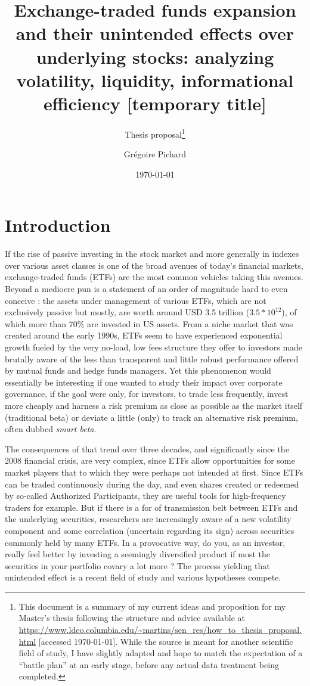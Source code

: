 \documentclass[a4paper, twoside, listof=totoc, toc=sectionentrywithdots]{scrartcl}
\title{Exchange-traded funds expansion and their unintended effects over underlying stocks: analyzing volatility, liquidity, informational efficiency {\small [temporary title]}}
\subtitle{Thesis proposal\footnote{This document is a summary of my current ideas and proposition for my Master's thesis following the structure and advice available at \url{https://www.ldeo.columbia.edu/~martins/sen_res/how_to_thesis_proposal.html} [accessed \today]. While the source is meant for another scientific field of study, I have slightly adapted and hope to match the expectation of a ``battle plan'' at an early stage, before any actual data treatment being completed.}}
\date{\today}
\author{Grégoire Pichard}
\begin{document}
\maketitle
\tableofcontents
\section{Introduction}
If the rise of passive investing in the stock market and more generally in indexes over various asset classes is one of the broad avenues of today's financial markets, exchange-traded funds (ETFs) are the most common vehicles taking this avenues. Beyond a mediocre pun is a statement of an order of magnitude hard to even conceive : the assets under management of various ETFs, which are not exclusively passive but mostly, are worth around USD 3.5 trillion ($3.5 * 10^{12}$), of which more than 70\% are invested in US assets. From a niche market that was created around the early 1990s, ETFs seem to have experienced exponential growth fueled by the very no-load, low fees structure they offer to investors made brutally aware of the less than transparent and little robust performance offered by mutual funds and hedge funds managers. Yet this phenomenon would essentially be interesting if one wanted to study their impact over corporate governance, if the goal were only, for investors, to trade less frequently, invest more cheaply and harness a risk premium as close as possible as the market itself (traditional beta) or deviate a little (only) to track an alternative risk premium, often dubbed \textit{smart beta}.

The consequences of that trend over three decades, and significantly since the 2008 financial crisis, are very complex, since ETFs allow opportunities for some market players that to which they were perhaps not intended at first. Since ETFs can be traded continuously during the day, and even shares created or redeemed by so-called Authorized Participants, they are useful tools for high-frequency traders for example. But if there is a for of transmission belt between ETFs and the underlying securities, researchers are increasingly aware of a new volatility component and some correlation (uncertain regarding its sign) across securities commonly held by many ETFs. In a provocative way, do you, as an investor, really feel better by investing a seemingly diversified product if most the securities in your portfolio covary a lot more ? The process yielding that unintended effect is a recent field of study and various hypotheses compete.
\end{document}
